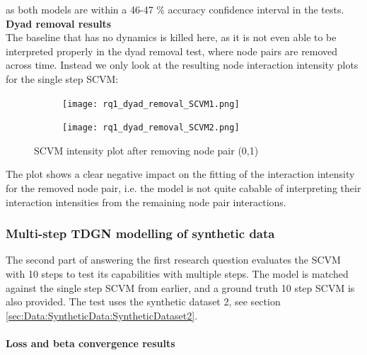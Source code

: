 \noindent
as both  models are within a 46-47 \% accuracy confidence interval in the tests.
\clearpage
\noindent
\textbf{Dyad removal results}
\\
\noindent
The baseline that has no dynamics is killed here, as it is not even able to be interpreted properly in the dyad removal test, where node pairs are removed across time. Instead we only look at the resulting node interaction intensity plots for the single step SCVM:
\begin{figure}[H]
    \centering
    \begin{subfigure}[b]{\textwidth}
        \centering
        \texttt{[image: rq1\_dyad\_removal\_SCVM1.png]}
    \end{subfigure}
    \hfill
    \begin{subfigure}[b]{\textwidth}
        \centering
        \texttt{[image: rq1\_dyad\_removal\_SCVM2.png]}
    \end{subfigure}
        \caption{SCVM intensity plot after removing node pair (0,1)}
    \label{fig:RQ1:SCVM_accuracy}
\end{figure}
\noindent
The plot shows a clear negative impact on the fitting of the interaction intensity for the removed node pair, i.e. the model is not quite cabable of interpreting their interaction intensities from the remaining node pair interactions.

\subsubsection{Multi-step TDGN modelling of synthetic data}
\label{sec:ResearchQuestion1:multiStepSynthetic}
The second part of answering the first research question evaluates the SCVM with 10 steps to test its capabilities with multiple steps. The model is matched against the single step SCVM from earlier, and a ground truth 10 step SCVM is also provided. 
The test uses the synthetic dataset 2, see section \ref{sec:Data:SyntheticData:SyntheticDataset2}.
\\\\
\textbf{Loss and beta convergence results}


